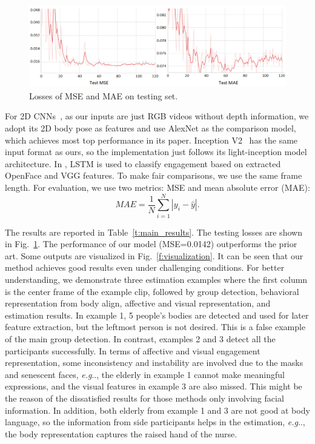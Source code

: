 \documentclass[twocolumn]{svjour3}
\makeatletter
\DeclareRobustCommand\onedot{\futurelet\@let@token\@onedot}
\def\@onedot{\ifx\@let@token.\else.\null\fi\xspace}
\def\eg{\emph{e.g}\onedot} \def\Eg{\emph{E.g}\onedot}
\makeatother
\begin{document}
\begin{figure}[t]
  \centering
  \includegraphics[width=\linewidth]{assets/loss}
  \caption{Losses of MSE and MAE on testing set.}
  \label{f:loss}
\end{figure}

For 2D CNNs~\cite{Anagnostopoulou2021Engagement}, as our inputs are just RGB videos without depth information, we adopt its 2D body pose as features and use AlexNet as the comparison model, which achieves most top performance in its paper. Inception V2~\cite{Saleh2021Improving} has the same input format as ours, so the implementation just follows its light-inception model architecture. In \cite{Steinert2020Engagement}, LSTM is used to classify engagement based on extracted OpenFace and VGG features. To make fair comparisons, we use the same frame length. For evaluation, we use two metrics: MSE and mean absolute error (MAE):
\begin{equation}
  MAE = \frac{1}{N}\sum_{i=1}^N|y_i-\hat{y}|.
\end{equation}

The results are reported in Table~\ref{t:main_results}. The testing losses are shown in Fig.~\ref{f:loss}. The performance of our model (MSE=0.0142) outperforms the prior art. Some outputs are visualized in Fig.~\ref{f:visualization}. It can be seen that our method achieves good results even under challenging conditions. For better understanding, we demonstrate three estimation examples where the first column is the center frame of the example clip, followed by group detection, behavioral representation from body align, affective and visual representation, and estimation results. In example 1, 5 people's bodies are detected and used for later feature extraction, but the leftmost person is not desired. This is a false example of the main group detection. In contrast, examples 2 and 3 detect all the participants successfully. In terms of affective and visual engagement representation, some inconsistency and instability are involved due to the masks and senescent faces, \eg, the elderly in example 1 cannot make meaningful expressions, and the visual features in example 3 are also missed. This might be the reason of the dissatisfied results for those methods only involving facial information. In addition, both elderly from example 1 and 3 are not good at body language, so the information from side participants helps in the estimation, \eg, the body representation captures the raised hand of the nurse.
\end{document}
